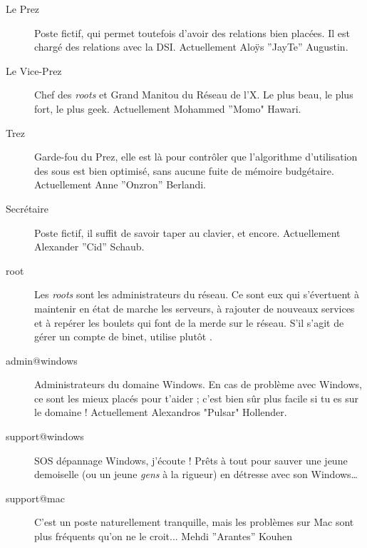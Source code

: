 \begin{description}

  \item[Le Prez]{Poste fictif, qui permet toutefois d'avoir des relations bien plac\'ees. Il est charg\'e des relations avec la DSI. Actuellement Aloÿs ''JayTe'' Augustin.}
  
  \item[Le Vice-Prez]{Chef des \emph{roots} et Grand Manitou du R\'eseau de l'X. Le plus beau, le plus fort, le plus geek. Actuellement Mohammed ''Momo" Hawari.}

  \item[Trez]{Garde-fou du Prez, elle est l\`a pour contr\^oler que l'algorithme d'utilisation des sous est bien optimis\'e, sans aucune fuite de m\'emoire budg\'etaire. Actuellement Anne ''Onzron'' Berlandi.}

  \item[Secr\'etaire]{Poste fictif, il suffit de savoir taper au clavier, et encore. Actuellement Alexander ''Cid'' Schaub.}

  \item[root]{Les \emph{roots} sont les administrateurs du r\'eseau. Ce sont eux qui s'\'evertuent \`a maintenir en \'etat de marche les serveurs, \`a rajouter de 
  nouveaux services et \`a rep\'erer les boulets qui font de la merde sur le r\'eseau. S'il s'agit de g\'erer un compte de binet, utilise plut\^ot .}

  \item[admin@windows] {Administrateurs du domaine Windows. En cas de probl\`eme avec Windows, ce sont les mieux plac\'es pour t'aider ;
  c'est bien s\^ur  plus facile si tu es sur le domaine ! Actuellement Alexandros "Pulsar" Hollender.}
  
  \item[support@windows] {SOS d\'epannage Windows, j'\'ecoute ! Pr\^ets \`a tout pour sauver une jeune demoiselle (ou un jeune \emph{gens} \`a la rigueur) en d\'etresse avec son Windows\dots }

  \item[support@mac] {C'est un poste naturellement tranquille, mais les probl\`emes sur Mac sont plus fr\'equents qu'on ne le croit... Mehdi ''Arantes'' Kouhen}
  
  


\end{description}
